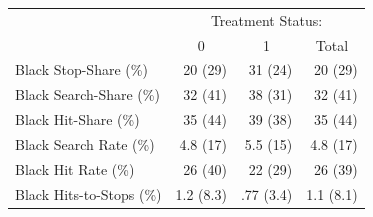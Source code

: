 \documentclass{article}
\begin{document}
\begin{table}[!h]
\centering
\begin{tabular}{llll}
\cline{1-4}
\multicolumn{1}{r}{} &
  \multicolumn{3}{c}{Treatment Status:} \\
\multicolumn{1}{r}{} &
  \multicolumn{1}{c}{0} &
  \multicolumn{1}{c}{1} &
  \multicolumn{1}{c}{Total} \\
\cline{1-4}
\multicolumn{1}{l}{Black Stop-Share (\%)} &
  \multicolumn{1}{r}{20 (29)} &
  \multicolumn{1}{r}{31 (24)} &
  \multicolumn{1}{r}{20 (29)} \\
\multicolumn{1}{l}{Black Search-Share (\%)} &
  \multicolumn{1}{r}{32 (41)} &
  \multicolumn{1}{r}{38 (31)} &
  \multicolumn{1}{r}{32 (41)} \\
\multicolumn{1}{l}{Black Hit-Share (\%)} &
  \multicolumn{1}{r}{35 (44)} &
  \multicolumn{1}{r}{39 (38)} &
  \multicolumn{1}{r}{35 (44)} \\
\multicolumn{1}{l}{Black Search Rate (\%)} &
  \multicolumn{1}{r}{4.8 (17)} &
  \multicolumn{1}{r}{5.5 (15)} &
  \multicolumn{1}{r}{4.8 (17)} \\
\multicolumn{1}{l}{Black Hit Rate (\%)} &
  \multicolumn{1}{r}{26 (40)} &
  \multicolumn{1}{r}{22 (29)} &
  \multicolumn{1}{r}{26 (39)} \\
\multicolumn{1}{l}{Black Hits-to-Stops (\%)} &
  \multicolumn{1}{r}{1.2 (8.3)} &
  \multicolumn{1}{r}{.77 (3.4)} &
  \multicolumn{1}{r}{1.1 (8.1)} \\
\cline{1-4}
\end{tabular}
\end{table}
\end{document}

